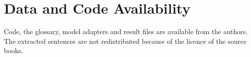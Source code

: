 \documentclass[conference]{IEEEtran}
\begin{document}
\section*{Data and Code Availability}
Code, the glossary, model adapters and result files are available from the authors. The extracted sentences are not redistributed because of the licence of the source books.



\end{document}
